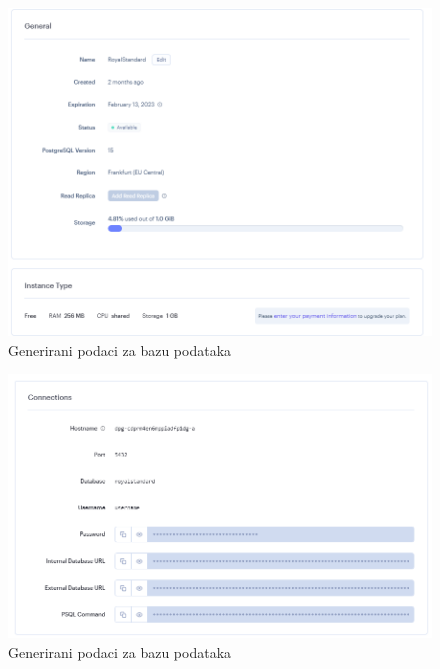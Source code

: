 		\begin{figure}[H]
			\includegraphics[width=\textwidth]{slike/Baza1.PNG} 
			\caption{Generirani podaci za bazu podataka}
			\label{fig:Generirani podaci za bazu}
		\end{figure}
		
		\begin{figure}[H]
			\includegraphics[width=\textwidth]{slike/Baza2.PNG} 
			\caption{Generirani podaci za bazu podataka}
			\label{fig:Generirani podaci za bazu}
		\end{figure}
	
